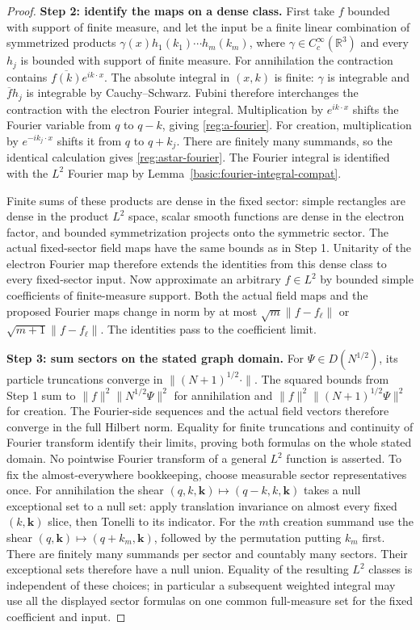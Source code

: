\documentclass[11pt,a4paper]{article}
\theoremstyle{definition}
\theoremstyle{remark}
\begin{document}
\begin{proof}
\textbf{Step 2: identify the maps on a dense class.}
First take \(f\) bounded with support of finite measure, and let the
input be a finite linear combination of symmetrized products
\(\gamma(x)h_1(k_1)\cdots h_m(k_m)\), where
\(\gamma\in C_c^\infty(\mathbb R^3)\) and every \(h_j\) is bounded
with support of finite measure. For annihilation the contraction
contains \(\overline{f(k)}e^{ik\cdot x}\). The absolute integral
in \((x,k)\) is finite: \(\gamma\) is integrable and
\(\overline f h_j\) is integrable by Cauchy--Schwarz.
Fubini therefore interchanges the contraction with the electron
Fourier integral. Multiplication by \(e^{ik\cdot x}\) shifts the
Fourier variable from \(q\) to \(q-k\), giving
\eqref{reg:a-fourier}. For creation, multiplication by
\(e^{-ik_j\cdot x}\) shifts it from \(q\) to \(q+k_j\).
There are finitely many summands, so the identical calculation gives
\eqref{reg:astar-fourier}. The Fourier integral is identified with
the \(L^2\) Fourier map by Lemma~\ref{basic:fourier-integral-compat}.

Finite sums of these products are dense in the fixed sector: simple
rectangles are dense in the product \(L^2\) space, scalar smooth
functions are dense in the electron factor, and bounded
symmetrization projects onto the symmetric sector. The actual
fixed-sector field maps have the same bounds as in Step 1. Unitarity
of the electron Fourier map therefore extends the identities from
this dense class to every fixed-sector input. Now approximate an
arbitrary \(f\in L^2\) by bounded simple coefficients of
finite-measure support. Both the actual field maps and the proposed
Fourier maps change in norm by at most \(\sqrt m\|f-f_\ell\|\)
or \(\sqrt{m+1}\|f-f_\ell\|\). The identities pass to the
coefficient limit.

\textbf{Step 3: sum sectors on the stated graph domain.}
For \(\Psi\in D(N^{1/2})\), its particle truncations converge in
\(\|(N+1)^{1/2}\cdot\|\). The squared bounds from Step 1 sum to
\(\|f\|^2\|N^{1/2}\Psi\|^2\) for annihilation and
\(\|f\|^2\|(N+1)^{1/2}\Psi\|^2\) for creation.
The Fourier-side sequences and the actual field vectors therefore
converge in the full Hilbert norm. Equality for finite truncations
and continuity of Fourier transform identify their limits, proving
both formulas on the whole stated domain. No pointwise Fourier
transform of a general \(L^2\) function is asserted.
To fix the almost-everywhere bookkeeping, choose measurable sector
representatives once. For annihilation the shear
$(q,k,\mathbf k)\mapsto(q-k,k,\mathbf k)$ takes a null
exceptional set to a null set: apply translation invariance on
almost every fixed $(k,\mathbf k)$ slice, then Tonelli to its
indicator. For the $m$th creation summand use the shear
$(q,\mathbf k)\mapsto(q+k_m,\mathbf k)$, followed by the
permutation putting $k_m$ first. There are finitely many summands
per sector and countably many sectors. Their exceptional sets
therefore have a null union. Equality of the resulting $L^2$
classes is independent of these choices; in particular a subsequent
weighted integral may use all the displayed sector formulas on one
common full-measure set for the fixed coefficient and input.
\end{proof}
\end{document}

